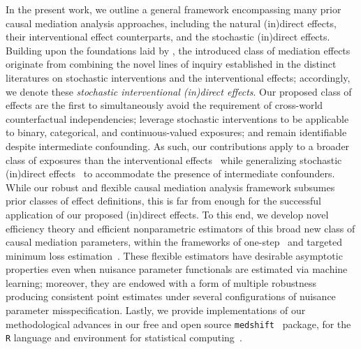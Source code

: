 In the present work, we outline a general framework encompassing many prior
causal mediation analysis approaches, including the natural (in)direct effects,
their interventional effect counterparts, and the stochastic (in)direct effects.
Building upon the foundations laid by \citet{diaz2020causal}, the introduced
class of mediation effects originate from combining the novel lines of inquiry
established in the distinct literatures on stochastic interventions and the
interventional effects; accordingly, we denote these \textit{stochastic
interventional (in)direct effects}. Our proposed class of effects are the first
to simultaneously avoid the requirement of cross-world counterfactual
independencies; leverage stochastic interventions to be applicable to binary,
categorical, and continuous-valued exposures; and remain identifiable despite
intermediate confounding. As such, our contributions apply to a broader class of
exposures than the interventional effects~\citep[e.g.,][]{diaz2020nonparametric,
benkeser2020nonparametric} while generalizing stochastic (in)direct
effects~\citep[e.g.,][]{diaz2020causal} to accommodate the presence of
intermediate confounders. While our robust and flexible causal mediation
analysis framework subsumes prior classes of effect definitions, this is far
from enough for the successful application of our proposed (in)direct effects.
To this end, we develop novel efficiency theory and efficient nonparametric
estimators of this broad new class of causal mediation parameters, within the
frameworks of one-step~\citep{pfanzagl1985contributions, bickel1993efficient}
and targeted minimum loss estimation~\citep{vdl2006targeted, vdl2011targeted,
vdl2018targeted}. These flexible estimators have desirable asymptotic properties
even when nuisance parameter functionals are estimated via machine learning;
moreover, they are endowed with a form of multiple robustness producing
consistent point estimates under several configurations of nuisance parameter
misspecification. Lastly, we provide implementations of our methodological
advances in our free and open source
\texttt{medshift}~\citep{hejazi2020medshift} package, for the \texttt{R}
language and environment for statistical computing~\citep{R}.

